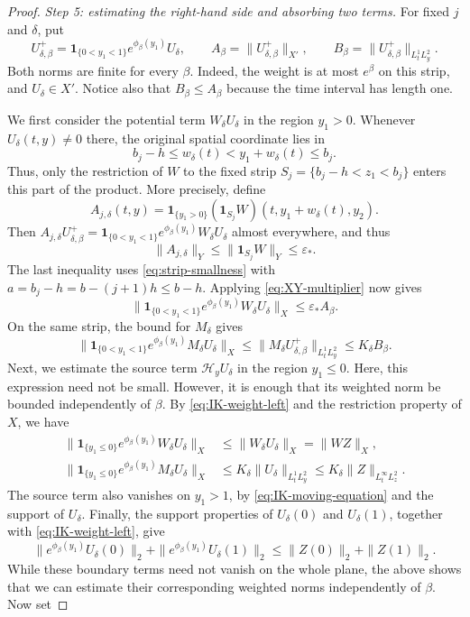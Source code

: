 \documentclass[11pt]{amsart}
\theoremstyle{remark}
\newcommand{\HH}{\mathcal H}
\newcommand{\1}{\mathbf 1}
\begin{document}
\begin{proof}
\noindent\emph{Step 5: estimating the right-hand side and absorbing two terms.}
For fixed $j$ and $\delta$,  put
\[
 U_{\delta,\beta}^{+}
 =\1_{\{0<y_1<1\}}e^{\phi_\beta(y_1)}U_\delta,
 \qquad
 A_\beta=\|U_{\delta,\beta}^{+}\|_{X'},
 \qquad
 B_\beta=\|U_{\delta,\beta}^{+}\|_{L^1_tL^2_y}.
\]
Both norms are finite for every $\beta$. Indeed, the weight is at most $e^\beta$
on this strip, and $U_\delta\in X'$.  Notice also that $B_\beta\le A_\beta$
because the time interval has length one.

We first consider the potential term $W_\delta U_\delta$ in the region $y_1>0$.
Whenever $U_\delta(t,y)\ne0$ there, the original spatial coordinate lies in
\[
 b_j-h\le w_\delta(t)<y_1+w_\delta(t)\le b_j.
\]
Thus, only the restriction of $W$ to the fixed strip
$S_j=\{b_j-h<z_1<b_j\}$ enters this part of the product.
More precisely, define
\[
 A_{j,\delta}(t,y)
 =\1_{\{y_1>0\}}(\1_{S_j}W)(t,y_1+w_\delta(t),y_2).
\]
Then $A_{j,\delta}U_{\delta,\beta}^{+}
=\1_{\{0<y_1<1\}}e^{\phi_\beta(y_1)}W_\delta U_\delta$
almost everywhere, and thus
\[
 \|A_{j,\delta}\|_Y\le\|\1_{S_j}W\|_Y\le\varepsilon_*.
\]
The last inequality uses \eqref{eq:strip-smallness} with
$a=b_j-h=b-(j+1)h\le b-h$.
Applying \eqref{eq:XY-multiplier} now gives
\[
 \|\1_{\{0<y_1<1\}}e^{\phi_\beta(y_1)}
       W_\delta U_\delta\|_X
 \le\varepsilon_* A_\beta.
\]
On the same strip, the bound for $M_\delta$ gives
\[
 \|\1_{\{0<y_1<1\}}e^{\phi_\beta(y_1)}
       M_\delta U_\delta\|_X
 \le\|M_\delta U_{\delta,\beta}^{+}\|_{L^1_tL^2_y}
 \le K_\delta B_\beta.
\]
Next, we estimate the source term $\HH_yU_\delta$ in the region $y_1\leq 0$. Here, this expression need not be small. However, it is enough that its
weighted norm be bounded independently of $\beta$.
By \eqref{eq:IK-weight-left} and the restriction property of $X$, we have
\begin{align*}
 \|\1_{\{y_1\le0\}}e^{\phi_\beta(y_1)}W_\delta U_\delta\|_X
 &\le\|W_\delta U_\delta\|_X=\|WZ\|_X,\\
 \|\1_{\{y_1\le0\}}e^{\phi_\beta(y_1)}M_\delta U_\delta\|_X
 &\le K_\delta\|U_\delta\|_{L^1_tL^2_y}
 \le K_\delta\|Z\|_{L^\infty_tL^2_z}.
\end{align*}
The source term also vanishes on $y_1>1$, by
\eqref{eq:IK-moving-equation} and the support of $U_\delta$.
Finally, the support properties of $U_\delta(0)$ and $U_\delta(1)$,
together with \eqref{eq:IK-weight-left}, give
\[
 \|e^{\phi_\beta(y_1)}U_\delta(0)\|_2
 +\|e^{\phi_\beta(y_1)}U_\delta(1)\|_2
 \le\|Z(0)\|_2+\|Z(1)\|_2.
\]
While these boundary terms need not vanish on the whole plane, the above shows that we can estimate their corresponding weighted norms independently of $\beta$. Now set

\end{proof}
\end{document}
